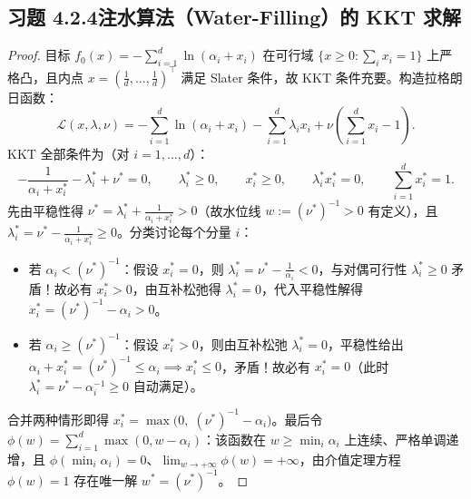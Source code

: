 \subsection*{习题 4.2.4\quad 注水算法（Water-Filling）的 KKT 求解}
\begin{proof}
目标 $f_0(x) = -\sum_{i=1}^d \ln(\alpha_i + x_i)$ 在可行域 $\{x \ge 0 : \sum_i x_i = 1\}$ 上严格凸，且内点 $x = (\frac{1}{d}, \dots, \frac{1}{d})^\top$ 满足 Slater 条件，故 KKT 条件充要。构造拉格朗日函数：
\[
  \mathcal{L}(x, \lambda, \nu) = -\sum_{i=1}^d \ln(\alpha_i + x_i) - \sum_{i=1}^d \lambda_i x_i + \nu\!\left(\sum_{i=1}^d x_i - 1\right).
\]
KKT 全部条件为（对 $i = 1, \dots, d$）：
\[
  -\frac{1}{\alpha_i + x_i^*} - \lambda_i^* + \nu^* = 0, \qquad
  \lambda_i^* \ge 0, \qquad x_i^* \ge 0, \qquad
  \lambda_i^* x_i^* = 0, \qquad \sum_{i=1}^d x_i^* = 1.
\]
先由平稳性得 $\nu^* = \lambda_i^* + \frac{1}{\alpha_i + x_i^*} > 0$（故水位线 $w := (\nu^*)^{-1} > 0$ 有定义），且 $\lambda_i^* = \nu^* - \frac{1}{\alpha_i + x_i^*} \ge 0$。分类讨论每个分量 $i$：
\begin{itemize}
  \item 若 $\alpha_i < (\nu^*)^{-1}$：假设 $x_i^* = 0$，则 $\lambda_i^* = \nu^* - \frac{1}{\alpha_i} < 0$，与对偶可行性 $\lambda_i^* \ge 0$ 矛盾！故必有 $x_i^* > 0$，由互补松弛得 $\lambda_i^* = 0$，代入平稳性解得 $x_i^* = (\nu^*)^{-1} - \alpha_i > 0$。
  \item 若 $\alpha_i \ge (\nu^*)^{-1}$：假设 $x_i^* > 0$，则由互补松弛 $\lambda_i^* = 0$，平稳性给出 $\alpha_i + x_i^* = (\nu^*)^{-1} \le \alpha_i \implies x_i^* \le 0$，矛盾！故必有 $x_i^* = 0$（此时 $\lambda_i^* = \nu^* - \alpha_i^{-1} \ge 0$ 自动满足）。
\end{itemize}
合并两种情形即得 $x_i^* = \max\!\big(0,\; (\nu^*)^{-1} - \alpha_i\big)$。最后令 $\phi(w) = \sum_{i=1}^d \max(0, w - \alpha_i)$：该函数在 $w \ge \min_i \alpha_i$ 上连续、严格单调递增，且 $\phi(\min_i \alpha_i) = 0$、$\lim_{w\to+\infty}\phi(w) = +\infty$，由介值定理方程 $\phi(w) = 1$ 存在唯一解 $w^* = (\nu^*)^{-1}$。
\end{proof}

